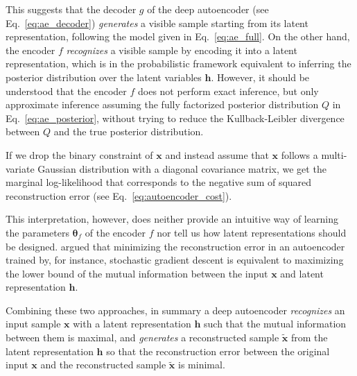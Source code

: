 \documentclass[dissertation,nocontribution]{aaltoseries}
\newcommand{\vect}[1]{\mathbf{#1}}
\newcommand{\vects}[1]{\boldsymbol{#1}}
\newcommand{\vh}[0]{\vect{h}}
\newcommand{\vx}[0]{\vect{x}}
\newcommand{\TT}[0]{{\vects{\theta}}}
\begin{document}
This suggests that the decoder $g$ of the deep autoencoder
(see Eq.~\eqref{eq:ae_decoder}) \textit{generates} a visible
sample starting from its latent representation, following
the model given in Eq.~\eqref{eq:ae_full}. On the other
hand, the encoder $f$ \textit{recognizes} a visible sample
by encoding it into a latent representation, which is in the
probabilistic framework equivalent to inferring the
posterior distribution over the latent variables $\vh$.
However, it should be understood that the encoder $f$ does
not perform exact inference, but only approximate inference
assuming the fully factorized posterior distribution $Q$ in
Eq.~\eqref{eq:ae_posterior}, without trying to reduce
the Kullback-Leibler divergence between $Q$ and the true
posterior distribution.

If we drop the binary constraint of $\vx$ and instead assume
that $\vx$ follows a multi-variate Gaussian distribution
with a diagonal covariance matrix, we get the marginal
log-likelihood that corresponds to the negative sum of
squared reconstruction error (see
Eq.~\eqref{eq:autoencoder_cost}).

This interpretation, however, does neither provide an intuitive
way of learning the parameters $\TT_f$ of the encoder $f$ nor
tell us how latent representations should be designed.
\citet{Vincent2010} argued that minimizing the reconstruction
error in an autoencoder trained by, for instance, stochastic
gradient descent is equivalent to maximizing the lower bound of
the mutual information between the input $\vx$ and latent
representation $\vh$. 

Combining these two approaches, in summary a deep
autoencoder \textit{recognizes} an input sample $\vx$ with a
latent representation $\vh$ such that the mutual information
between them is maximal, and \textit{generates} a
reconstructed sample $\tilde{\vx}$ from the latent
representation $\vh$ so that the reconstruction error
between the original input $\vx$ and the reconstructed
sample $\tilde{\vx}$ is minimal.

\end{document}
